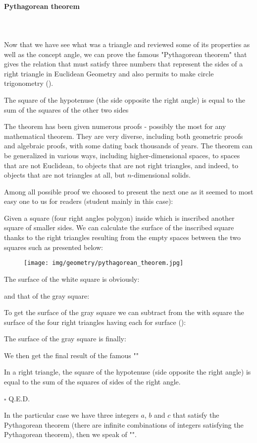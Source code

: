 	\pagebreak
	\paragraph{Pythagorean theorem}\label{pythagorean theorem}\mbox{}\\\\
	Now that we have see what was a triangle and reviewed some of its properties as well as the concept angle, we can prove the famous "Pythagorean theorem" that gives the relation that must satisfy three numbers that represent the sides of a right triangle in Euclidean Geometry and also permits to make circle trigonometry ().
	
	\begin{theorem}
	The square of the hypotenuse (the side opposite the right angle) is equal to the sum of the squares of the other two sides
	\end{theorem}
	The theorem has been given numerous proofs - possibly the most for any mathematical theorem. They are very diverse, including both geometric proofs and algebraic proofs, with some dating back thousands of years. The theorem can be generalized in various ways, including higher-dimensional spaces, to spaces that are not Euclidean, to objects that are not right triangles, and indeed, to objects that are not triangles at all, but $n$-dimensional solids.
	
	Among all possible proof we choosed to present the next one as it seemed to most easy one to us for readers (student mainly in this case):
	\begin{dem}
	Given a square (four right angles polygon) inside which is inscribed another square of smaller sides. We can calculate the surface of the inscribed square thanks to the right triangles resulting from the empty spaces between the two squares such as presented below:
	\begin{figure}[H]
		\centering
		\texttt{[image: img/geometry/pythagorean\_theorem.jpg]}
	\end{figure}
	The surface of the white square is obviously:
	
	and that of the gray square:
	
	To get the surface of the gray square we can subtract from the with square the surface of the four right triangles having each for surface ():
	
	The surface of the gray square is finally:
	
	We then get the final result of the famous ""
	
	In a right triangle, the square of the hypotenuse (side opposite the right angle) is equal to the sum of the squares of sides of the right angle.
	\begin{flushright}
		$\square$  Q.E.D.
	\end{flushright}
	\end{dem}
	In the particular case we have three integers $a$, $b$ and $c$ that satisfy the Pythagorean theorem (there are infinite combinations of integers satisfying the Pythagorean theorem), then we speak of "".
	
